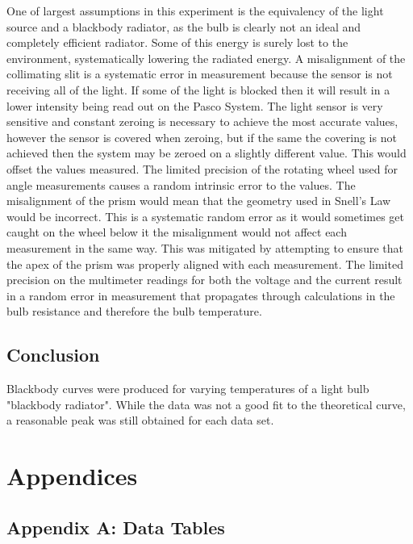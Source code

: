 \documentclass[a4paper]{article}
\begin{document}
\qq One of largest assumptions in this experiment is the equivalency of the light
source and a blackbody radiator, as the bulb is clearly not an
ideal and completely efficient radiator. Some of this energy is surely lost to the environment, systematically 
lowering the radiated energy. 
A misalignment of the collimating slit is a systematic error in
measurement because the sensor is not receiving all of the light. If
some of the light is blocked then it will result in a lower intensity
being read out on the Pasco System. The light sensor is very sensitive
and constant zeroing is necessary to achieve the most accurate values,
however the sensor is covered when zeroing, but if the same the
covering is not achieved then the system may be zeroed on a slightly
different value. This would offset the values measured. The limited
precision of the rotating wheel used for angle measurements causes a
random intrinsic error to the values. The misalignment of the prism
would mean that the geometry used in Snell's Law would be
incorrect. This is a systematic random error as it would sometimes get
caught on the wheel below it the misalignment would not affect each
measurement in the same way. This was mitigated by attempting to
ensure that the apex of the prism was properly aligned with each
measurement. The limited precision on the multimeter readings for both
the voltage and the current result in a random error in measurement
that propagates through calculations in the bulb resistance and
therefore the bulb temperature.

\subsection{Conclusion}
Blackbody curves were produced for varying temperatures of a light bulb "blackbody radiator". While the data was not a good fit to the theoretical curve, a reasonable peak was still obtained for each data set.

\section{Appendices}

\subsection{Appendix A: Data Tables}
\end{document}
